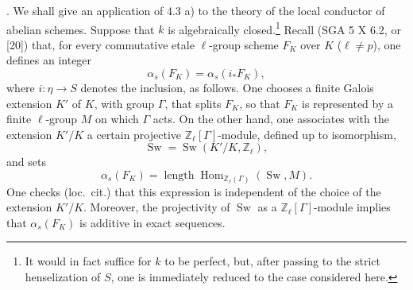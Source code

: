 %

\medskip
{}. We shall give an application of 4.3 a) to the theory of the local
conductor of abelian schemes.  Suppose that $k$ is algebraically
closed.\footnote{It would in fact suffice for $k$ to be perfect, but,
after passing to the strict henselization of $S$, one is immediately
reduced to the case considered here.}  Recall (SGA 5 X 6.2, or [20])
that, for every commutative etale $\ell$-group scheme $F_K$ over $K$
($\ell\neq p$), one defines an integer
\begin{equation}\tag{4.5.1}
 \alpha_s(F_K)=\alpha_s(i_*F_K),
\end{equation}
where $i:\eta\longrightarrow S$ denotes the inclusion, as follows.  One
chooses a finite Galois extension $K'$ of $K$, with group $\Gamma$,
that splits $F_K$, so that $F_K$ is represented by a finite
$\ell$-group $M$ on which $\Gamma$ acts.  On the other hand, one
associates with the extension $K'/K$ a certain projective
$\mathbb Z_\ell[\Gamma]$-module, defined up to isomorphism,
\begin{equation}\tag{4.5.2}
 \operatorname{Sw}=\operatorname{Sw}(K'/K,\mathbb Z_\ell),
\end{equation}
and sets
\begin{equation}\tag{4.5.3}
 \alpha_s(F_K)
 =\operatorname{length}
   \operatorname{Hom}_{\mathbb Z_\ell(\Gamma)}(\operatorname{Sw},M).
\end{equation}
One checks (loc.\ cit.) that this expression is independent of the
choice of the extension $K'/K$.  Moreover, the projectivity of
$\operatorname{Sw}$ as a $\mathbb Z_\ell[\Gamma]$-module implies that
$\alpha_s(F_K)$ is additive in exact sequences.

